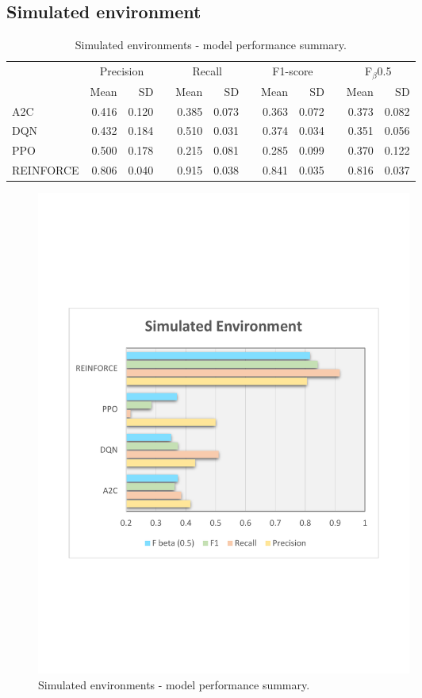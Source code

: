 \documentclass[a4paper, 12pt]{article}
\newcommand{\rowspace}[1]{\renewcommand{\arraystretch}{#1}}
\begin{document}
\subsection{Simulated environment}
\begin{table}[h]\centering\sffamily
	\rowspace{1.3}
	\begin{tabular}{@{}l rr c rr c rr c rr@{}}
		\arrayrulecolor{black!40}\toprule
		& \multicolumn{2}{c}{Precision} & \phantom{i} & \multicolumn{2}{c}{Recall} & \phantom{i} & \multicolumn{2}{c}{F1-score} & \phantom{i} & \multicolumn{2}{c}{F$_\beta$0.5} \\
		\cmidrule{2-3} \cmidrule{5-6} \cmidrule{8-9} \cmidrule{11-12} 
		
		&Mean &SD & &Mean &SD & &Mean &SD& &Mean & SD\\ \midrule
		A2C & 0.416 & 0.120 & &0.385 & 0.073 & & 0.363 & 0.072 & &0.373 &0.082 \\
		DQN & 0.432 & 0.184 & &0.510 & 0.031 & & 0.374 & 0.034 & &0.351 &0.056 \\
		PPO & 0.500 & 0.178 & &0.215 & 0.081 & & 0.285 & 0.099 & &0.370 &0.122 \\
		REINFORCE & \textcolor{dblue}{0.806} & 0.040 & &\textcolor{dblue}{0.915} & 0.038 & & \textcolor{dblue}{0.841} & 0.035 & &\textcolor{dblue}{0.816} &0.037 \\
		
		
		\bottomrule
	\end{tabular}
	\caption{Simulated environments - model performance summary.}
	\label{tbl:SimulatedEnv}
\end{table}
\begin{figure}[h]
	\centering
	\includegraphics[width=0.6\textwidth, trim={1.5cm 7cm 1cm 7cm}]{images/SimulatedPlot.pdf}  
	\caption{Simulated environments - model performance summary.}
	\label{fig:SimulatedEnv}
\end{figure}
\end{document}
